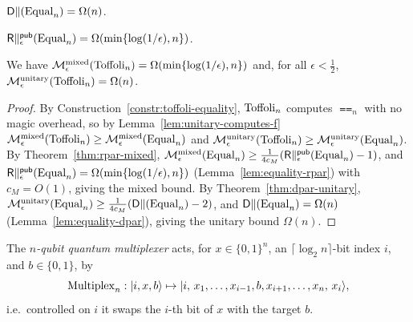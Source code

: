 \begin{lemma}
  \label{lem:equality-dpar}
  \notready
  $\mathsf{D}\|(\mathrm{Equal}_n) = \Omega(n)$.
\end{lemma}

\begin{lemma}
  \label{lem:equality-rpar}
  \notready
  $\mathsf{R}\|^{\mathsf{pub}}_\epsilon(\mathrm{Equal}_n) = \Omega(\min\{\log(1/\epsilon), n\})$.
\end{lemma}

\begin{lemma}
  \label{lem:toffoli-bound}
  We have $\mathcal{M}^{\mathrm{mixed}}_\epsilon(\mathrm{Toffoli}_n) = \Omega(\min\{\log(1/\epsilon), n\})$ and,
  for all $\epsilon<\tfrac12$, $\mathcal{M}^{\mathrm{unitary}}_\epsilon(\mathrm{Toffoli}_n) = \Omega(n)$.
\end{lemma}
\begin{proof}
  By Construction~\ref{constr:toffoli-equality}, $\mathrm{Toffoli}_n$ computes $\Equal_n$
  with no magic overhead, so by Lemma~\ref{lem:unitary-computes-f}
  $\mathcal{M}^{\mathrm{mixed}}_\epsilon(\mathrm{Toffoli}_n) \ge \mathcal{M}^{\mathrm{mixed}}_\epsilon(\mathrm{Equal}_n)$ and
  $\mathcal{M}^{\mathrm{unitary}}_\epsilon(\mathrm{Toffoli}_n)\ge\mathcal{M}^{\mathrm{unitary}}_\epsilon(\mathrm{Equal}_n)$. By
  Theorem~\ref{thm:rpar-mixed},
  $\mathcal{M}^{\mathrm{mixed}}_\epsilon(\mathrm{Equal}_n) \ge \tfrac{1}{4c_M}(\mathsf{R}\|^{\mathsf{pub}}_\epsilon(\mathrm{Equal}_n)-1)$,
  and $\mathsf{R}\|^{\mathsf{pub}}_\epsilon(\mathrm{Equal}_n) = \Omega(\min\{\log(1/\epsilon),n\})$
  (Lemma~\ref{lem:equality-rpar}) with $c_M = O(1)$, giving the mixed bound. By
  Theorem~\ref{thm:dpar-unitary},
  $\mathcal{M}^{\mathrm{unitary}}_\epsilon(\mathrm{Equal}_n) \ge \tfrac{1}{4c_M}(\mathsf{D}\|(\mathrm{Equal}_n)-2)$, and
  $\mathsf{D}\|(\mathrm{Equal}_n) = \Omega(n)$ (Lemma~\ref{lem:equality-dpar}), giving the
  unitary bound $\Omega(n)$.
\end{proof}

\begin{definition}
  \label{def:multiplexer}
  The \emph{$n$-qubit quantum multiplexer} acts, for $x\in\{0,1\}^n$, an
  $\lceil\log_2 n\rceil$-bit index $i$, and $b\in\{0,1\}$, by
  \[
    \mathrm{Multiplex}_n : \lvert i, x, b\rangle \mapsto
      \lvert i,\, x_1,\dots,x_{i-1}, b, x_{i+1},\dots,x_n,\, x_i\rangle ,
  \]
  i.e.\ controlled on $i$ it swaps the $i$-th bit of $x$ with the target $b$.
\end{definition}

